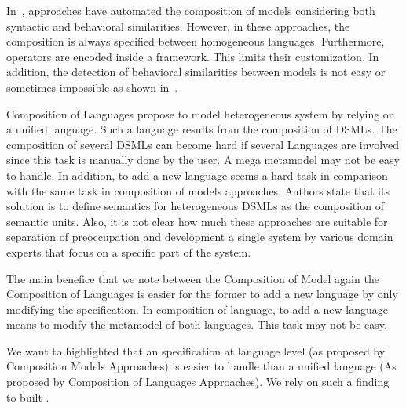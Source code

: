 In~\cite{?,?}, approaches have automated the composition of models considering both syntactic and behavioral similarities. However, in these approaches, the composition is always specified between homogeneous languages. Furthermore, operators are encoded inside a framework. This limits their customization. In addition, the detection of behavioral similarities between models is not easy or sometimes impossible as shown in~\cite{?}. 

Composition of Languages propose to model heterogeneous system by relying on a unified language. Such a language results from the composition of DSMLs. The composition of several DSMLs can become hard if several Languages are involved since this task is manually done by the user. A mega metamodel may not be easy to handle. In addition, to add a new language seems a hard task in comparison with the same task in composition of models approaches. Authors state that its solution is to define semantics for heterogeneous DSMLs as the composition of semantic units. Also, it is not clear how much these approaches are suitable for separation of preoccupation and development a single system by various domain experts that focus on a specific part of the system. 

The main benefice that we note between the Composition of Model again the Composition of Languages is easier for the former to add a new language by only modifying the specification. In composition of language, to add a new language means to modify the metamodel of both languages. This task may not be easy. 

We want to highlighted that an specification at language level (as proposed by Composition Models Approaches) is easier to handle than a unified language (As proposed by Composition of Languages Approaches). We rely on such a finding to built \bcool.
 


